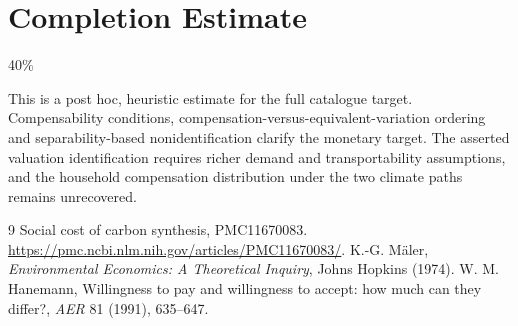 \documentclass[11pt]{article}
\theoremstyle{definition}
\begin{document}
\section{Completion Estimate}
40\%

This is a post hoc, heuristic estimate for the full catalogue target.
Compensability conditions, compensation-versus-equivalent-variation ordering and separability-based nonidentification clarify the monetary target. The asserted valuation identification requires richer demand and transportability assumptions, and the household compensation distribution under the two climate paths remains unrecovered.

\begin{thebibliography}{9}
 Social cost of carbon synthesis, PMC11670083. \url{https://pmc.ncbi.nlm.nih.gov/articles/PMC11670083/}.
 K.-G. M\"aler, \emph{Environmental Economics: A Theoretical Inquiry}, Johns Hopkins (1974).
 W. M. Hanemann, Willingness to pay and willingness to accept: how much can they differ?, \emph{AER} 81 (1991), 635--647.
\end{thebibliography}
\end{document}
